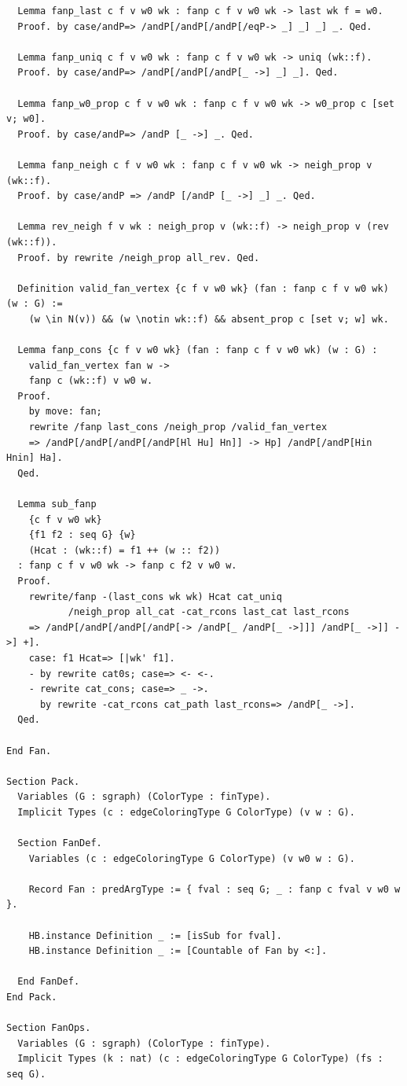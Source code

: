 \begin{verbatim}
  Lemma fanp_last c f v w0 wk : fanp c f v w0 wk -> last wk f = w0.
  Proof. by case/andP=> /andP[/andP[/andP[/eqP-> _] _] _] _. Qed.

  Lemma fanp_uniq c f v w0 wk : fanp c f v w0 wk -> uniq (wk::f).
  Proof. by case/andP=> /andP[/andP[/andP[_ ->] _] _]. Qed.

  Lemma fanp_w0_prop c f v w0 wk : fanp c f v w0 wk -> w0_prop c [set v; w0].
  Proof. by case/andP=> /andP [_ ->] _. Qed.

  Lemma fanp_neigh c f v w0 wk : fanp c f v w0 wk -> neigh_prop v (wk::f).
  Proof. by case/andP => /andP [/andP [_ ->] _] _. Qed.

  Lemma rev_neigh f v wk : neigh_prop v (wk::f) -> neigh_prop v (rev (wk::f)).
  Proof. by rewrite /neigh_prop all_rev. Qed.

  Definition valid_fan_vertex {c f v w0 wk} (fan : fanp c f v w0 wk) (w : G) :=
    (w \in N(v)) && (w \notin wk::f) && absent_prop c [set v; w] wk.
  
  Lemma fanp_cons {c f v w0 wk} (fan : fanp c f v w0 wk) (w : G) : 
    valid_fan_vertex fan w ->
    fanp c (wk::f) v w0 w.
  Proof. 
    by move: fan;
    rewrite /fanp last_cons /neigh_prop /valid_fan_vertex
    => /andP[/andP[/andP[/andP[Hl Hu] Hn]] -> Hp] /andP[/andP[Hin Hnin] Ha].
  Qed.

  Lemma sub_fanp 
    {c f v w0 wk}
    {f1 f2 : seq G} {w}
    (Hcat : (wk::f) = f1 ++ (w :: f2))
  : fanp c f v w0 wk -> fanp c f2 v w0 w.
  Proof.
    rewrite/fanp -(last_cons wk wk) Hcat cat_uniq 
           /neigh_prop all_cat -cat_rcons last_cat last_rcons
    => /andP[/andP[/andP[/andP[-> /andP[_ /andP[_ ->]]] /andP[_ ->]] ->] +].
    case: f1 Hcat=> [|wk' f1].
    - by rewrite cat0s; case=> <- <-.
    - rewrite cat_cons; case=> _ ->.
      by rewrite -cat_rcons cat_path last_rcons=> /andP[_ ->].
  Qed.

End Fan.

Section Pack.
  Variables (G : sgraph) (ColorType : finType).
  Implicit Types (c : edgeColoringType G ColorType) (v w : G).

  Section FanDef.
    Variables (c : edgeColoringType G ColorType) (v w0 w : G).

    Record Fan : predArgType := { fval : seq G; _ : fanp c fval v w0 w }.

    HB.instance Definition _ := [isSub for fval].
    HB.instance Definition _ := [Countable of Fan by <:].

  End FanDef.
End Pack.

Section FanOps.
  Variables (G : sgraph) (ColorType : finType).
  Implicit Types (k : nat) (c : edgeColoringType G ColorType) (fs : seq G).


\end{verbatim}
